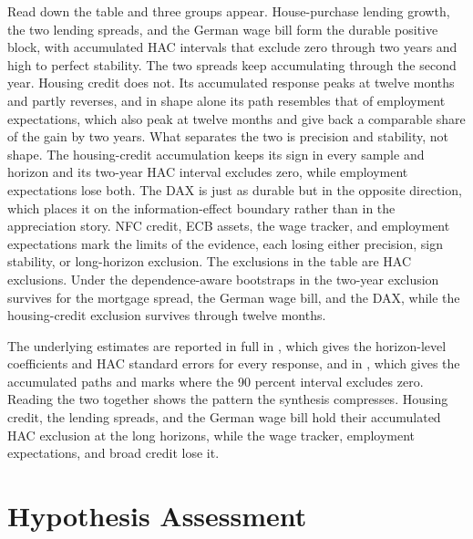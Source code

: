 

Read down the table and three groups appear. House-purchase lending growth, the two lending spreads, and the German wage bill form the durable positive block, with accumulated HAC intervals that exclude zero through two years and high to perfect stability. The two spreads keep accumulating through the second year. Housing credit does not. Its accumulated response peaks at twelve months and partly reverses, and in shape alone its path resembles that of employment expectations, which also peak at twelve months and give back a comparable share of the gain by two years. What separates the two is precision and stability, not shape. The housing-credit accumulation keeps its sign in every sample and horizon and its two-year HAC interval excludes zero, while employment expectations lose both. The DAX is just as durable but in the opposite direction, which places it on the information-effect boundary rather than in the appreciation story. NFC credit, ECB assets, the wage tracker, and employment expectations mark the limits of the evidence, each losing either precision, sign stability, or long-horizon exclusion. The exclusions in the table are HAC exclusions. Under the dependence-aware bootstraps in  the two-year exclusion survives for the mortgage spread, the German wage bill, and the DAX, while the housing-credit exclusion survives through twelve months.

The underlying estimates are reported in full in , which gives the horizon-level coefficients and HAC standard errors for every response, and in , which gives the accumulated paths and marks where the 90 percent interval excludes zero. Reading the two together shows the pattern the synthesis compresses. Housing credit, the lending spreads, and the German wage bill hold their accumulated HAC exclusion at the long horizons, while the wage tracker, employment expectations, and broad credit lose it.





\section{Hypothesis Assessment}

